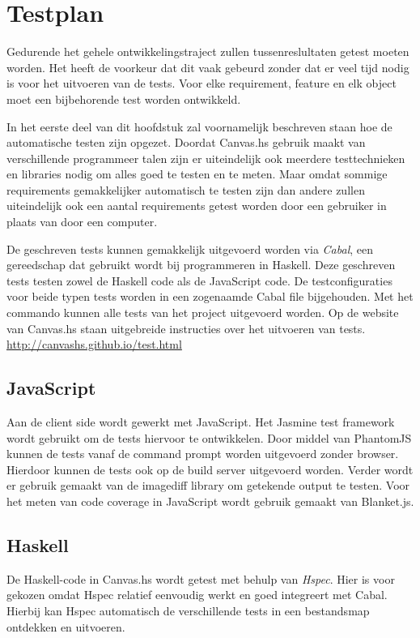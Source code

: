 \chapter{Testplan} \label{hoofdstuk:testplan}
Gedurende het gehele ontwikkelingstraject zullen tussenreslultaten getest moeten worden. Het heeft de voorkeur dat dit vaak gebeurd zonder dat er veel tijd nodig is voor het uitvoeren van de tests. Voor elke requirement, feature en elk object moet een bijbehorende test worden ontwikkeld.

In het eerste deel van dit hoofdstuk zal voornamelijk beschreven staan hoe de automatische testen zijn opgezet. Doordat Canvas.hs gebruik maakt van verschillende programmeer talen zijn er uiteindelijk ook meerdere testtechnieken en libraries nodig om alles goed te testen en te meten. Maar omdat sommige requirements gemakkelijker automatisch te testen zijn dan andere zullen uiteindelijk ook een aantal requirements getest worden door een gebruiker in plaats van door een computer.

De geschreven tests kunnen gemakkelijk uitgevoerd worden via \emph{Cabal}, een gereedschap dat gebruikt wordt bij programmeren in Haskell. Deze geschreven tests testen zowel de Haskell code als de JavaScript code. De testconfiguraties voor beide typen tests worden in een zogenaamde Cabal file bijgehouden. Met het commando  kunnen alle tests van het project uitgevoerd worden. Op de website van Canvas.hs staan uitgebreide instructies over het uitvoeren van tests. \url{http://canvashs.github.io/test.html}

\section{JavaScript} 
Aan de client side wordt gewerkt met JavaScript. Het Jasmine\cite{Jasmine} test framework wordt gebruikt om de tests hiervoor te ontwikkelen. Door middel van PhantomJS\cite{PhantomJS} kunnen de tests vanaf de command prompt worden uitgevoerd zonder browser. Hierdoor kunnen de tests ook op de build server uitgevoerd worden. Verder wordt er gebruik gemaakt van de imagediff\cite{imagediff} library om getekende output te testen. Voor het meten van code coverage in JavaScript wordt gebruik gemaakt van Blanket.js\cite{Blanket.js}.

\section{Haskell}
De Haskell-code in Canvas.hs wordt getest met behulp van \emph{Hspec}\cite{Hspec}. Hier is voor gekozen omdat Hspec relatief eenvoudig werkt en goed integreert met Cabal. Hierbij kan Hspec automatisch de verschillende tests in een bestandsmap ontdekken en uitvoeren.

